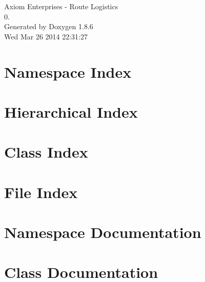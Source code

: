 \documentclass[twoside]{book}
\newcommand{\clearemptydoublepage}{%
  \newpage{\pagestyle{empty}\cleardoublepage}%
}
\begin{document}
\hypersetup{pageanchor=false}
\begin{titlepage}
\vspace*{7cm}
\begin{center}%
{\Large Axiom Enterprises -\/ Route Logistics \\[1ex]\large 0. }\\
\vspace*{1cm}
{\large Generated by Doxygen 1.8.6}\\
\vspace*{0.5cm}
{\small Wed Mar 26 2014 22:31:27}\\
\end{center}
\end{titlepage}
\clearemptydoublepage
\tableofcontents
\clearemptydoublepage
{}
\hypersetup{pageanchor=true}

\chapter{Namespace Index}

\chapter{Hierarchical Index}

\chapter{Class Index}

\chapter{File Index}

\chapter{Namespace Documentation}




\chapter{Class Documentation}











\end{document}
